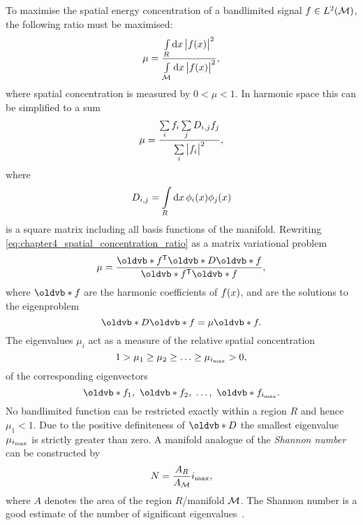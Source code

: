 To maximise the spatial energy concentration of a bandlimited signal \(f \in L^{2}(\mathcal{M})\), the following ratio must be maximised:
%
\begin{equation}
	\mu
	= \frac{\int\limits_{R} \dd{x} \big\lvert f(x)\big\rvert^{2}}{\int\limits_{\mathcal{M}} \dd{x} \big\lvert f(x)\big\rvert^{2}},
\end{equation}
%
where spatial concentration is measured by \(0 < \mu < 1\).
In harmonic space this can be simplified to a sum
%
\begin{equation}\label{eq:chapter4_spatial_concentration_ratio}
	\mu
	= \frac{\sum\limits_{i} f_{i} \sum\limits_{j} D_{i,j} f_{j}}{\sum\limits_{i} \big\lvert f_{i}\big\rvert^{2}},
\end{equation}
%
where
%
\begin{equation}
	D_{i,j}
	= \int\limits_{R} \dd{x} \phi_{i}(x) \phi_{j}(x)
\end{equation}
%
is a square matrix including all basis functions of the manifold.
Rewriting \cref{eq:chapter4_spatial_concentration_ratio} as a matrix variational problem
%
\begin{equation}
	\mu
	= \frac{\transpose{\vb{f}} \vb{D} \vb{f}}{\transpose{\vb{f}} \vb{f}},
\end{equation}
%
where \(\vb{f}\) are the harmonic coefficients of \(f(x)\), and are the solutions to the eigenproblem
%
\begin{equation}\label{eq:chapter4_eigenproblem}
	\vb{D}\vb{f}
	= \mu \vb{f}.
\end{equation}
%
The eigenvalues \(\mu_{i}\) act as a measure of the relative spatial concentration
%
\begin{equation}
	1 > \mu_{1} \geq \mu_{2} \geq \ldots \geq \mu_{\imax} > 0, %
\end{equation}
%
of the corresponding eigenvectors
%
\begin{equation}
	\vb{f}_{1},\ \vb{f}_{2},\ \ldots,\ \vb{f}_{\imax}.
\end{equation}
%
No bandlimited function can be restricted exactly within a region \(R\) and hence \(\mu_{1}<1\).
Due to the positive definiteness of \(\vb{D}\) the smallest eigenvalue \(\mu_{i_{\text{max}}}\) is strictly greater than zero.
A manifold analogue of the \emph{Shannon number} can be constructed by
%
\begin{equation}\label{eq:chapter4_shannon}
	N
	= \frac{A_{R}}{A_{\mathcal{M}}} i_{\text{max}},
\end{equation}
%
where \(A\) denotes the area of the region \(R\)/manifold \(\mathcal{M}{}\).
The Shannon number is a good estimate of the number of significant eigenvalues~\cite{Percival1993}.

